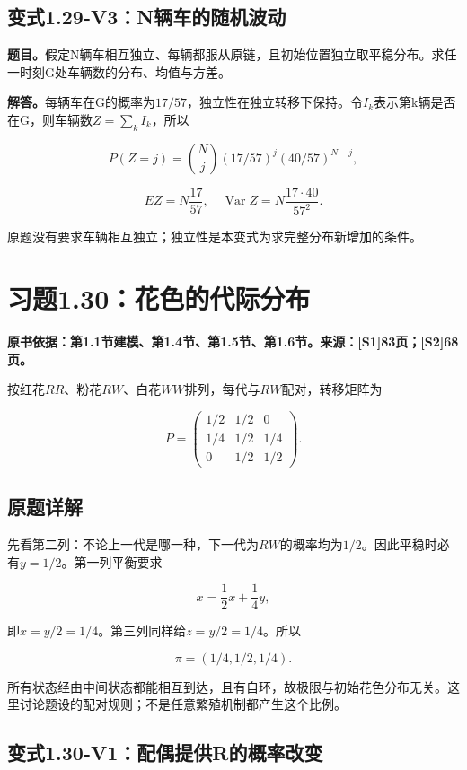 \documentclass[
  11pt,
  a4paper,
  UTF8,
  fontset=fandol]{ctexart}
\begin{document}
\subsection{变式1.29-V3：N辆车的随机波动}\label{ux53d8ux5f0f1.29-v3nux8f86ux8f66ux7684ux968fux673aux6ce2ux52a8}

\textbf{题目。}假定N辆车相互独立、每辆都服从原链，且初始位置独立取平稳分布。求任一时刻G处车辆数的分布、均值与方差。

\textbf{解答。}每辆车在G的概率为\(17/57\)，独立性在独立转移下保持。令\(I_k\)表示第k辆是否在G，则车辆数\(Z=\sum_kI_k\)，所以

\[
P(Z=j)=\binom Nj(17/57)^j(40/57)^{N-j},
\]

\[
\boxed{EZ=N\frac{17}{57},\quad\operatorname{Var}Z=N\frac{17\cdot40}{57^2}.}
\]

原题没有要求车辆相互独立；独立性是本变式为求完整分布新增加的条件。

\section{习题1.30：花色的代际分布}\label{ux4e60ux98981.30ux82b1ux8272ux7684ux4ee3ux9645ux5206ux5e03}

\textbf{原书依据：第1.1节建模、第1.4节、第1.5节、第1.6节。来源：{[}S1{]}83页；{[}S2{]}68页。}

按红花\(RR\)、粉花\(RW\)、白花\(WW\)排列，每代与\(RW\)配对，转移矩阵为

\[
P=\begin{pmatrix}1/2&1/2&0\\1/4&1/2&1/4\\0&1/2&1/2\end{pmatrix}.
\]

\subsection{原题详解}\label{ux539fux9898ux8be6ux89e3}

先看第二列：不论上一代是哪一种，下一代为\(RW\)的概率均为\(1/2\)。因此平稳时必有\(y=1/2\)。第一列平衡要求

\[
x=\frac12x+\frac14y,
\]

即\(x=y/2=1/4\)。第三列同样给\(z=y/2=1/4\)。所以

\[
\boxed{\pi=(1/4,1/2,1/4).}
\]

所有状态经由中间状态都能相互到达，且有自环，故极限与初始花色分布无关。这里讨论题设的配对规则；不是任意繁殖机制都产生这个比例。

\subsection{变式1.30-V1：配偶提供R的概率改变}\label{ux53d8ux5f0f1.30-v1ux914dux5076ux63d0ux4f9brux7684ux6982ux7387ux6539ux53d8}
\end{document}
